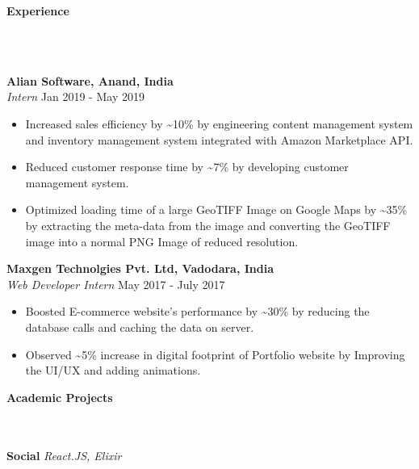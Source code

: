 \documentclass[]{article}
\newcommand{\lineunder} {
    \vspace*{-8pt} \\
    \hrulefill \\
}
\newcommand{\header} [1] {
    {\vspace*{6pt} \fontsize{12}{12}\selectfont \textbf{#1}}
     \lineunder
}
\begin{document}
\header{Experience}
\vspace{1mm}

\hspace{1mm}
\textbf{Alian Software, Anand, India}\\
\hspace{1mm}
\textit{Intern} \hfill Jan 2019 - May 2019\\
\vspace{-2mm}
\begin{itemize}
    \setlength\itemsep{0.2mm}
	\item Increased sales efficiency by \textasciitilde{}10\% by engineering content management system and inventory management system integrated with Amazon Marketplace API.
	\item Reduced customer response time by \textasciitilde{}7\% by developing customer management system.
	\item Optimized loading time of a large GeoTIFF Image on Google Maps by \textasciitilde{}35\% by extracting the meta-data from the image and converting the GeoTIFF image into a normal PNG Image of reduced resolution.
\end{itemize}
\hspace{1mm}
\textbf{Maxgen Technolgies Pvt. Ltd, Vadodara, India}\\
\hspace{1mm}
\textit{Web Developer Intern} \hfill May 2017 - July 2017\\
\vspace{-2mm}
\begin{itemize}
    \setlength\itemsep{0.2mm}
	\item Boosted E-commerce website's performance by \textasciitilde{}30\% by reducing the database calls and caching the data on server.
	\item Observed \textasciitilde{}5\% increase in digital footprint of Portfolio website by Improving the UI/UX and adding animations.
\end{itemize}



\header{Academic Projects}
{\hspace{2mm}\textbf{Social}} {\sl React.JS, Elixir} \\
\end{document}
